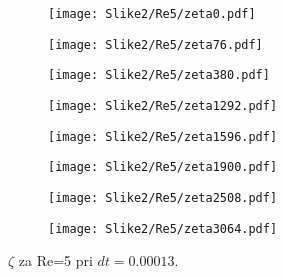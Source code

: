 \documentclass[12pt,a4paper]{article}
\begin{document}
\begin{figure}[H]
    \centering
    \begin{subfigure}[b]{0.2\textwidth}  			
        \texttt{[image: Slike2/Re5/zeta0.pdf]}
    \end{subfigure}
    \begin{subfigure}[b]{0.2\textwidth}  			
        \texttt{[image: Slike2/Re5/zeta76.pdf]}
    \end{subfigure}
    \begin{subfigure}[b]{0.2\textwidth}  			
        \texttt{[image: Slike2/Re5/zeta380.pdf]}
    \end{subfigure}
        \begin{subfigure}[b]{0.2\textwidth}  			
        \texttt{[image: Slike2/Re5/zeta1292.pdf]}
    \end{subfigure}
 
     \begin{subfigure}[b]{0.2\textwidth}  			
        \texttt{[image: Slike2/Re5/zeta1596.pdf]}
    \end{subfigure}
        \begin{subfigure}[b]{0.2\textwidth}  			
        \texttt{[image: Slike2/Re5/zeta1900.pdf]}
    \end{subfigure}
        \begin{subfigure}[b]{0.2\textwidth}  			
        \texttt{[image: Slike2/Re5/zeta2508.pdf]}
    \end{subfigure}
        \begin{subfigure}[b]{0.2\textwidth}  			
        \texttt{[image: Slike2/Re5/zeta3064.pdf]}
    \end{subfigure}
    \caption{$\zeta$ za Re=5 pri $dt=0.00013$.} \label{fig:slika4}
\end{figure}
\end{document}
